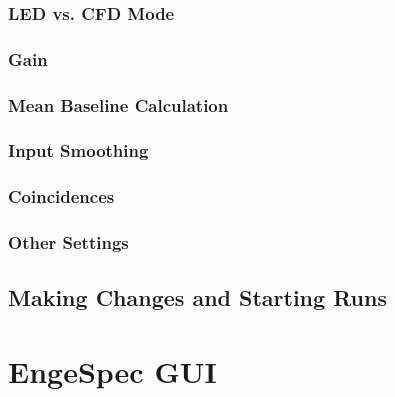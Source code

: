 \subsubsection{LED vs. CFD Mode} \label{LED_CFD}

\subsubsection{Gain} \label{gain}

\subsubsection{Mean Baseline Calculation} \label{mean_baseline_calc}

\subsubsection{Input Smoothing} \label{smoothing}

\subsubsection{Coincidences} \label{coincidences}


\subsubsection{Other Settings} \label{other_settings}

\subsection{Making Changes and Starting Runs}




\pagebreak
\section{EngeSpec GUI}

